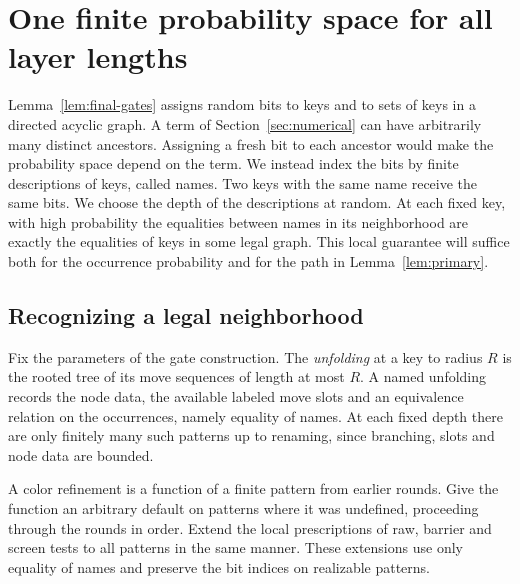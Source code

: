 \section{One finite probability space for all layer lengths}\label{sec:finite}

Lemma~\ref{lem:final-gates} assigns random bits to keys and to sets of keys
in a directed acyclic graph. A term of Section~\ref{sec:numerical} can have
arbitrarily many distinct ancestors. Assigning a fresh bit to each ancestor
would make the probability space depend on the term. We instead index the
bits by finite descriptions of keys, called names. Two keys with the same
name receive the same bits. We choose the depth of the descriptions at
random. At each fixed key, with high probability the equalities between
names in its neighborhood are exactly the equalities of keys in some legal
graph. This local guarantee will suffice both for the occurrence probability
and for the path in Lemma~\ref{lem:primary}.

\subsection{Recognizing a legal neighborhood}

Fix the parameters of the gate construction. The \emph{unfolding} at a key
to radius \(R\) is the rooted tree of its move sequences of length at most
\(R\). A named unfolding records the node data, the available labeled move
slots and an equivalence relation on the occurrences, namely equality of
names. At each fixed depth there are only finitely many such patterns up
to renaming, since branching, slots and node data are bounded.

A color refinement is a function of a finite pattern from earlier rounds.
Give the function an arbitrary default on patterns where it was undefined,
proceeding through the rounds in order. Extend the local prescriptions of
raw, barrier and screen tests to all patterns in the same manner. These
extensions use only equality of names and preserve the bit indices on
realizable patterns.

